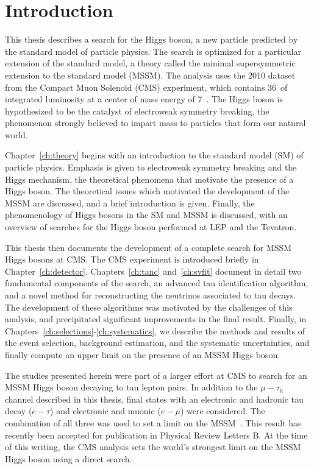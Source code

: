 \ifx\master\undefined\fi
\chapter*{Introduction} 

This thesis describes a search for the Higgs boson, a new particle predicted by
the standard model of particle physics.  The search is optimized for a
particular extension of the standard model, a theory called the minimal
supersymmetric extension to the standard model (MSSM).  The analysis uses the 2010 dataset from the
Compact Muon Solenoid (CMS) experiment, which contains 36~\pbinv of integrated
luminosity at a center of mass energy of 7~\TeV.  The Higgs boson is
hypothesized to be the catalyst of electroweak symmetry breaking, the phenomenon
strongly believed to impart mass to particles that form our natural world.

Chapter~\ref{ch:theory} begins with an introduction to the standard model (SM) of
particle physics. Emphasis is given to electroweak symmetry
breaking and the Higgs mechanism, the theoretical phenomena that motivate the
presence of a Higgs boson.  The theoretical issues which motivated the
development of the MSSM are discussed, and a brief introduction is given.
Finally, the phenomenology of Higgs bosons in the SM and MSSM is discussed, with
an overview of searches for the Higgs boson performed at LEP and the Tevatron.

This thesis then documents the development of a complete search for MSSM Higgs
bosons at CMS\@.  The CMS experiment is introduced briefly in
Chapter~\ref{ch:detector}. Chapters~\ref{ch:tanc} and~\ref{ch:svfit} document in
detail two fundamental components of the search, an advanced tau identification
algorithm, and a novel method for reconstructing the neutrinos associated to tau
decays.  The development of these algorithms was motivated by the challenges of
this analysis, and precipitated significant improvements in the final result.
Finally, in \mbox{Chapters~\ref{ch:selections}-\ref{ch:systematics}}, we
describe the methods and results of the event selection, background estimation,
and the systematic uncertainties, and finally compute an upper limit on the
presence of an MSSM Higgs boson.

The studies presented herein were part of a larger effort at CMS to search for
an MSSM Higgs boson decaying to tau lepton pairs.  In addition to the
$\mu-\tau_h$ channel described in this thesis, final states with an electronic
and hadronic tau decay ($e-\tau$) and electronic and muonic ($e-\mu$) were
considered.  The combination of all three was used to set a limit on the
MSSM~\cite{HIG-10-002}.  This result has recently been accepted for publication
in Physical Review Letters B.  At the time of this writing, the CMS analysis
sets the world's strongest limit on the MSSM Higgs boson using a direct search.
%
\ifx\master\undefined\fi
